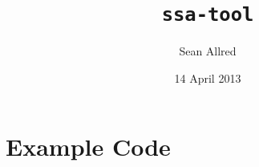 \documentclass[
minp=25,
maxp=35,
literate,
todo=marginpar,
]{smcm-cosc-smp}[2013/12/23]
\title{\texttt{ssa-tool}}[A Utility for the Creation and Evaluation \\
                               of Self-Stabilizing Algorithms]
\author{Sean Allred}[Alan Jamieson]
\date{14 April 2013}
\begin{document}
\maketitle
\thispagestyle{empty}

\begin{abstract}
  
\end{abstract}

\tableofcontents
\listoftables
\listoffigures
\lstlistoflistings

\clearpage









%







\appendix

\section*{Example Code}


\newpage
\printbibliography

\todos
\end{document}
